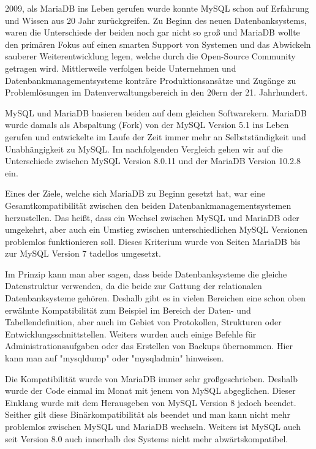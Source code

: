 
2009, als MariaDB ins Leben gerufen wurde konnte MySQL schon auf Erfahrung und Wissen aus 20 Jahr zurückgreifen. Zu Beginn des neuen Datenbanksystems, waren die Unterschiede der beiden noch gar nicht so groß und MariaDB wollte den primären Fokus auf einen smarten Support von Systemen und das Abwickeln sauberer Weiterentwicklung legen, welche durch die Open-Source Community getragen wird. Mittlerweile verfolgen beide Unternehmen und Datenbankmanagementsysteme konträre Produktionsansätze und Zugänge zu Problemlösungen im Datenverwaltungsbereich in den 20ern der 21. Jahrhundert. \cite{MariaVsMy}

MySQL und MariaDB basieren beiden auf dem gleichen Softwarekern. MariaDB wurde damals als Abspaltung (Fork) von der MySQL Version 5.1 ins Leben gerufen und entwickelte im Laufe der Zeit immer mehr an Selbstständigkeit und Unabhängigkeit zu MySQL. Im nachfolgenden Vergleich gehen wir auf die Unterschiede zwischen MySQL Version 8.0.11 und der MariaDB Version 10.2.8 ein. \cite{MariaVsMy}


Eines der Ziele, welche sich MariaDB zu Beginn gesetzt hat, war eine Gesamtkompatibilität zwischen den beiden Datenbankmanagementsystemen herzustellen. Das heißt, dass ein Wechsel zwischen MySQL und MariaDB oder umgekehrt, aber auch ein Umstieg zwischen unterschiedlichen MySQL Versionen problemlos funktionieren soll. Dieses Kriterium wurde von Seiten MariaDB bis zur MySQL Version 7 tadellos umgesetzt. \cite{MariaVsMy}

Im Prinzip kann man aber sagen, dass beide Datenbanksysteme die gleiche Datenstruktur verwenden, da die beide zur Gattung der relationalen Datenbanksysteme gehören. Deshalb gibt es in vielen Bereichen eine schon oben erwähnte Kompatibilität zum Beispiel im Bereich der Daten- und Tabellendefinition, aber auch im Gebiet von Protokollen, Strukturen oder Entwicklungsschnittstellen. Weiters wurden auch einige Befehle für Administrationsaufgaben oder das Erstellen von Backups übernommen. Hier kann man auf "mysqldump" oder "mysqladmin" hinweisen. \cite{MariaVsMy}

Die Kompatibilität wurde von MariaDB immer sehr großgeschrieben. Deshalb wurde der Code einmal im Monat mit jenem von MySQL abgeglichen. Dieser Einklang wurde mit dem Herausgeben von MySQL Version 8 jedoch beendet. Seither gilt diese Binärkompatibilität als beendet und man kann nicht mehr problemlos zwischen MySQL und MariaDB wechseln. Weiters ist MySQL auch seit Version 8.0 auch innerhalb des Systems nicht mehr abwärtskompatibel. \cite{MariaVsMy}

